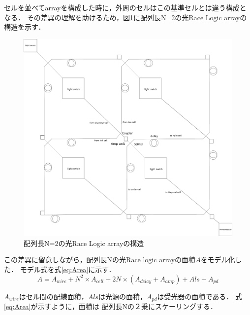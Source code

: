 セルを並べてarrayを構成した時に，外周のセルはこの基準セルとは違う構成となる．
その差異の理解を助けるため，図\ref{fig:N=2}に配列長N=2の光Race Logic arrayの構造を示す．
\begin{figure}[t!]
\begin{center}
\includegraphics[keepaspectratio,scale=0.35]{fig/4/lightracelogic_N_2.png}
\caption{配列長N=2の光Race Logic arrayの構造}
\label{fig:N=2}
\end{center}
\end{figure}

この差異に留意しながら，配列長Nの光Race logic arrayの面積$A$をモデル化した．
モデル式を式\ref{eq:Area}に示す．
\begin{equation}
A = A_{wire}+N^2 \times A_{cell} + 2N \times (A_{delay}+A_{amp}) +A{ls}+A_{pd}
\label{eq:Area}
\end{equation}

$A_{wire}はセル間の配線面積，A{ls}は光源の面積，A_{pd}は受光器の面積である．$
式\ref{eq:Area}が示すように，面積は
配列長Nの２乗にスケーリングする．

